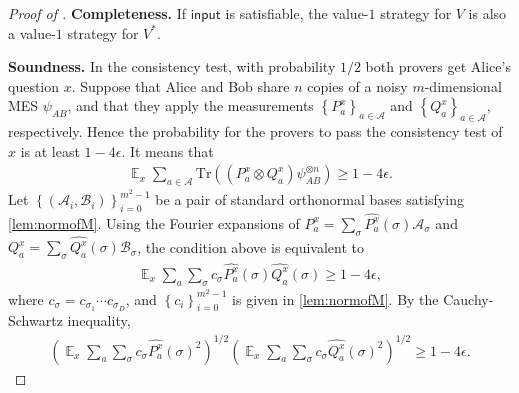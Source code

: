 \documentclass[10pt,a4paper]{article}
\theoremstyle{plain}
\theoremstyle{definition}
\newcommand {\set} [1] {\ensuremath{ \left\lbrace #1 \right\rbrace }}
\newcommand {\br} [1] {\ensuremath{ \left( #1 \right) }}
\DeclareMathOperator*{\bigE}{\mathbb{E}}
\newcommand {\Tr} {\ensuremath{ \mathrm{Tr} }}
\newcommand{\calA}{\mathcal{A}}
\newcommand{\calB}{\mathcal{B}}
\newcommand{\1}{\mathbb{1}} %
\newcommand{\ipt}{\mathsf{input}}
\begin{document}
\begin{proof}[Proof of ]
    \textbf{Completeness.} If $\ipt$ is satisfiable, the value-$1$ strategy for $V$ is also a value-$1$ strategy for $V^*$.

    \textbf{Soundness.} In the consistency test, with probability $1/2$ both provers get Alice's question $x$. Suppose that Alice and Bob share $n$ copies of a noisy $m$-dimensional MES $\psi_{AB}$, and that they apply the measurements $\set{P^x_a}_{a\in\calA}$ and $\set{Q^x_a}_{a\in\calA}$, respectively. Hence the probability for the provers to pass the consistency test of $x$ is at least $1 - 4\epsilon$.
     It means that    
\begin{align*}
    \bigE_{x} \sum_{a \in \calA} \Tr\br{\br{P^x_a \otimes Q^x_a} \psi_{AB}^{\otimes n}} \geq 1 - 4\epsilon.
\end{align*}
    Let $\set{\br{\calA_i,\calB_i}}_{i=0}^{m^2-1}$ be a pair of standard orthonormal bases satisfying \cref{lem:normofM}. Using the Fourier expansions of $P^x_a = \sum_\sigma \widehat{P^x_a}\br{\sigma}\calA_{\sigma}$ and $Q^x_a = \sum_\sigma \widehat{Q^x_a}\br{\sigma}\calB_{\sigma}$, the condition above is equivalent to 
\begin{align*}
\bigE_x \sum_a \sum_\sigma c_{\sigma} \widehat{P^x_a}\br{\sigma}\widehat{Q^x_a}\br{\sigma} \geq 1 - 4\epsilon,
\end{align*}
where $c_{\sigma}=c_{\sigma_1}\cdots c_{\sigma_D}$, and $\set{c_i}_{i=0}^{m^2-1}$ is given in \cref{lem:normofM}. By the Cauchy-Schwartz inequality,
\begin{align*}
\br{\bigE_x \sum_a \sum_\sigma c_{\sigma} \widehat{P^x_a}\br{\sigma}^2}^{1/2}\br{\bigE_x \sum_a \sum_\sigma c_{\sigma} \widehat{Q^x_a}\br{\sigma}^2}^{1/2}\geq1-4\epsilon.
\end{align*}


\end{proof}
\end{document}
